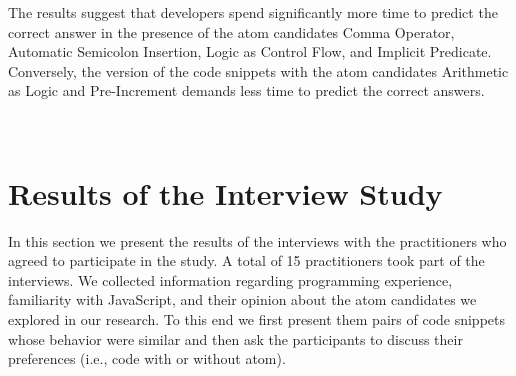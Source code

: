 \begin{mh}
  The results suggest that developers spend
  significantly more time to predict the
  correct answer in the presence of the
  atom candidates Comma Operator, Automatic Semicolon Insertion, Logic as
  Control Flow, and Implicit Predicate. Conversely,
  the version of the code snippets with the
  atom candidates Arithmetic as Logic and
  Pre-Increment demands less time to
  predict the correct answers. 
\end{mh}




\


\section{Results of the Interview Study}
\label{sec:interview-results}


In this section we present the results of the 
interviews with the practitioners who agreed to participate
in the study. A total of 15 practitioners
took part of the interviews.
We collected information regarding programming
experience, familiarity with JavaScript, and their opinion
about the \na atom candidates we explored in our research.
To this end we first present them pairs of code snippets whose behavior were similar
and then ask the participants to discuss their preferences (i.e.,
code with or without atom).



